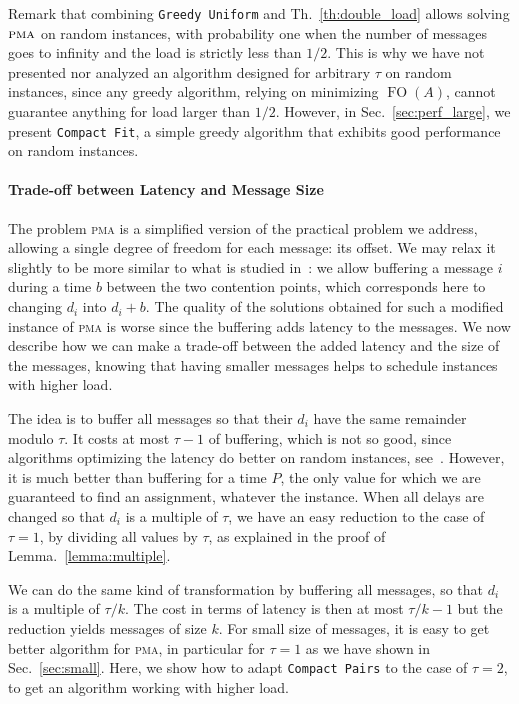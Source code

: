 \documentclass[a4paper,UKenglish,cleveref, autoref, thm-restate]{lipics-v2019}
\DeclareMathOperator{\Fo}{FO}
\newcommand\pma{\textsc{pma}\xspace}
\newcommand\compactpair{\texttt{Compact Pairs}\xspace}
\newcommand\greedyuniform{\texttt{Greedy Uniform}\xspace}
\newcommand\compactfit{\texttt{Compact Fit}\xspace}
\begin{document}
Remark that combining \greedyuniform and Th.~\ref{th:double_load} allows solving $\pma$ on random instances, with probability one when the number of messages goes to infinity and the load is strictly less than $1/2$. This is why we have not presented nor analyzed an algorithm designed for arbitrary $\tau$ on random instances, since any greedy algorithm, relying on minimizing $\Fo(A)$, cannot guarantee anything for load larger than $1/2$. However, in Sec.~\ref{sec:perf_large}, we present \compactfit, a simple greedy algorithm that exhibits good performance on random instances.

\paragraph*{Trade-off between Latency and Message Size}

The problem \pma is a simplified version of the practical problem we address, allowing a single degree of freedom for each message: its offset. We may relax it slightly to be more similar to what is studied in~\cite{barth2018deterministic}: we allow buffering a message $i$ during a time $b$ between the two contention points, which corresponds here to changing $d_i$ into $d_i + b$. The quality of the solutions obtained for such a modified instance of \pma is worse since the buffering adds latency to the messages. We now describe how we can make a trade-off between the added latency and the size of the messages, knowing that having smaller messages helps to schedule instances with higher load.

The idea is to buffer all messages so that their $d_i$ have the same
remainder modulo $\tau$. It costs at most $\tau - 1$ of buffering, which is not
so good, since algorithms optimizing the latency do better on random instances, see~\cite{barth2018deterministic}. However, it is much better than buffering for a time $P$, the only value for which we are guaranteed to find an assignment, whatever the instance. When all delays are changed so that $d_i$ is a multiple of $\tau$, we have an easy reduction to the case of $\tau = 1$, by dividing all values by $\tau$, as explained in the proof of Lemma.~\ref{lemma:multiple}.


We can do the same kind of transformation by buffering all messages, so that $d_i$ is a multiple of $\tau / k$. The cost in terms of latency is then at most $\tau / k - 1$ but the reduction yields messages of size $k$. For small size of messages, it is easy to get better algorithm for \pma, in particular for $\tau = 1$ as we have shown in Sec.~\ref{sec:small}. Here, we show how to adapt \compactpair to the case of $\tau = 2$, to get an algorithm working with higher load.
\end{document}
